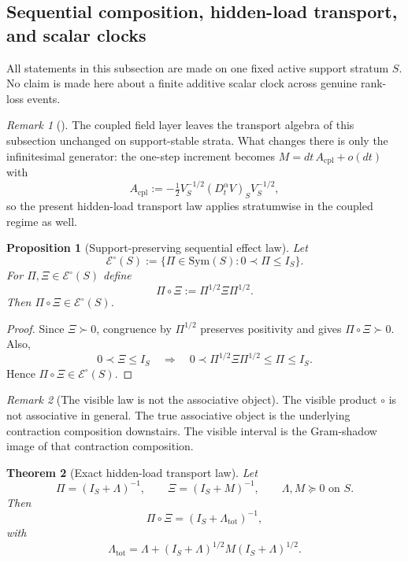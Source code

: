 \documentclass[11pt]{article}
\numberwithin{equation}{section}
\theoremstyle{thmcompact}
\newtheorem{theorem}{Theorem}[section]
\newtheorem{proposition}[theorem]{Proposition}
\theoremstyle{remark}
\newtheorem*{remarkplain}{Remark}
\newenvironment{remark}[1][]%
{\begin{remarkbox}\begin{remarkplain}[#1]\normalfont}
		{\end{remarkplain}\end{remarkbox}}
\begin{document}
\subsection{Sequential composition, hidden-load transport, and scalar clocks}
\label{sec:support_towers}

All statements in this subsection are made on one fixed active support stratum $S$. No claim is made here about a finite additive scalar clock across genuine rank-loss events.

\begin{remark}
The coupled field layer leaves the transport algebra of this subsection unchanged on support-stable strata. What changes there is only the infinitesimal generator: the one-step increment becomes $M=dt\,A_{\mathrm{cpl}}+o(dt)$ with
\[
A_{\mathrm{cpl}}:=-\tfrac12 V_S^{-1/2}(D_t^\alpha V)_S V_S^{-1/2},
\]
so the present hidden-load transport law applies stratumwise in the coupled regime as well.
\end{remark}

\begin{proposition}[Support-preserving sequential effect law]\label{prop:sequential-effect-law}
Let
\[
\mathcal E^\circ(S):=\{\Pi\in\mathrm{Sym}(S):0\prec \Pi\le I_S\}.
\]
For $\Pi,\Xi\in\mathcal E^\circ(S)$ define
\begin{equation}\label{eq:sequential-effect-law}
\Pi\circ\Xi:=\Pi^{1/2}\Xi\Pi^{1/2}.
\end{equation}
Then $\Pi\circ\Xi\in\mathcal E^\circ(S)$.
\end{proposition}

\begin{proof}
Since $\Xi\succ 0$, congruence by $\Pi^{1/2}$ preserves positivity and gives $\Pi\circ\Xi\succ 0$. Also,
\[
0\prec \Xi\le I_S
\quad\Longrightarrow\quad
0\prec \Pi^{1/2}\Xi\Pi^{1/2}\le \Pi\le I_S.
\]
Hence $\Pi\circ\Xi\in\mathcal E^\circ(S)$.
\end{proof}

\begin{remark}[The visible law is not the associative object]
The visible product $\circ$ is not associative in general. The true associative object is the underlying contraction composition downstairs. The visible interval is the Gram-shadow image of that contraction composition.
\end{remark}

\begin{theorem}[Exact hidden-load transport law]\label{thm:hidden-load-transport}
Let
\[
\Pi=(I_S+\Lambda)^{-1},
\qquad
\Xi=(I_S+M)^{-1},
\qquad
\Lambda,M\succeq 0 \text{ on } S.
\]
Then
\begin{equation}\label{eq:load-transport-product}
\Pi\circ\Xi=(I_S+\Lambda_{\mathrm{tot}})^{-1},
\end{equation}
with
\begin{equation}\label{eq:load-transport-law}
\Lambda_{\mathrm{tot}}
=
\Lambda + (I_S+\Lambda)^{1/2} M (I_S+\Lambda)^{1/2}.
\end{equation}
\end{theorem}
\end{document}
